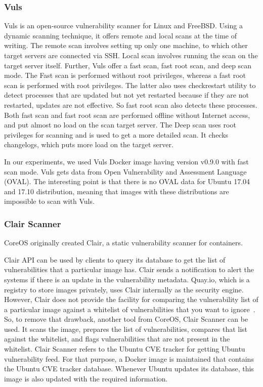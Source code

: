 \documentclass[a4paper,num-refs]{oup-contemporary}
\begin{document}
\subsubsection{Vuls}

Vuls is an open-source vulnerability scanner for Linux and FreeBSD.
Using a dynamic scanning technique, it offers
remote and local scans at the time of writing. The remote scan involves setting up only one machine, to
which other target servers are connected via SSH. Local scan involves running
the scan on the target server itself. Further, Vuls offer a fast scan, fast root scan,
and deep scan mode.
The Fast scan is performed without root privileges, whereas a fast root scan is
performed with root privileges. The latter also uses checkrestart utility to 
detect processes that are updated but not yet restarted because if they are not
restarted, updates are not effective. So fast root scan also detects these
processes. Both fast scan and fast root scan are performed offline without Internet
access, and put almost no load on the scan target server. The Deep scan uses
root privileges for scanning and is used to get a more detailed scan. It checks
changelogs, which puts more load on the target server.

In our experiments, we used Vuls Docker image having version v0.9.0 with fast scan mode.
Vuls gets data from Open Vulnerability and Assessment Language (OVAL).
The interesting point is that there is no OVAL data for Ubuntu 17.04 and 17.10 distribution,
meaning that images with these distributions are impossible to scan with Vuls.

\subsubsection{Clair Scanner}

CoreOS originally created Clair, a static vulnerability scanner for containers. 

Clair API can be used by clients to query its database to get
the list of vulnerabilities that a particular image has. Clair sends a notification
to alert the systems if there is an update in the vulnerability metadata. Quay.io, which
is a registry to store images privately, uses Clair internally as the security engine. However, Clair does not 
provide the facility for comparing
the vulnerability list of a particular image against a whitelist of vulnerabilities that you
want to ignore~\cite{arminc_2019}. 
So, to remove
that drawback, another tool from CoreOS, Clair Scanner can be used. It scans the image, prepares the list of
vulnerabilities, compares that list against the whitelist, and flags vulnerabilities
that are not present in the whitelist.
Clair Scanner refers to the Ubuntu CVE tracker for getting Ubuntu vulnerability feed.
For that purpose, a Docker image is maintained that contains the Ubuntu CVE tracker database.
Whenever Ubuntu updates its database, this image is also updated with the required information.
\end{document}
